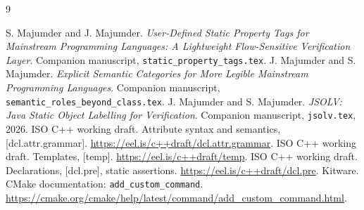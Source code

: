 \documentclass[11pt]{article}
\begin{document}
\begin{thebibliography}{9}
\raggedright
{} S. Majumder and J. Majumder.
\emph{User-Defined Static Property Tags for Mainstream Programming Languages:
A Lightweight Flow-Sensitive Verification Layer}. Companion manuscript,
\texttt{static\_property\_tags.tex}.
 J. Majumder and S. Majumder.
\emph{Explicit Semantic Categories for More Legible Mainstream Programming Languages}.
Companion manuscript,
\texttt{semantic\_roles\_beyond\_class.tex}.
 J. Majumder and S. Majumder.
\emph{JSOLV: Java Static Object Labelling for Verification}.
Companion manuscript, \texttt{jsolv.tex}, 2026.
 ISO C++ working draft.
Attribute syntax and semantics, [dcl.attr.grammar].
\url{https://eel.is/c++draft/dcl.attr.grammar}.
 ISO C++ working draft.
Templates, [temp]. \url{https://eel.is/c++draft/temp}.
 ISO C++ working draft.
Declarations, [dcl.pre], static assertions.
\url{https://eel.is/c++draft/dcl.pre}.
 Kitware. CMake documentation: \texttt{add\_custom\_command}.
\url{https://cmake.org/cmake/help/latest/command/add_custom_command.html}.
\end{thebibliography}
\end{document}
